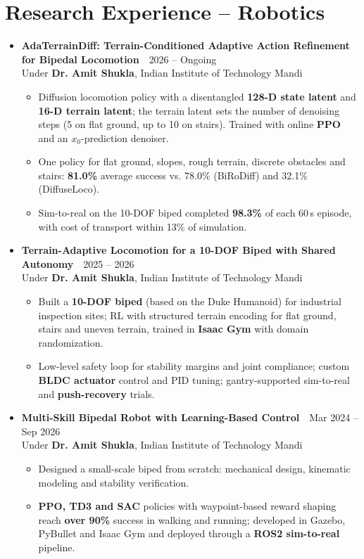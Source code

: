 \documentclass[letterpaper,10pt]{article}
\newcommand{\project}[3]{%
  \item[]\textbf{#1}\ \ {\small #2}\\
  {\small #3}\vspace{-4pt}}
\newenvironment{bullets}{\begin{itemize}[label=\textbullet]\small}{\end{itemize}\vspace{-2pt}}
\newenvironment{entries}{\begin{itemize}[leftmargin=0in, label={}, itemsep=6pt]}{\end{itemize}}
\begin{document}
\section{Research Experience -- Robotics}
\begin{entries}
  \project{AdaTerrainDiff: Terrain-Conditioned Adaptive Action Refinement for Bipedal Locomotion}{2026 -- Ongoing}
          {Under \textbf{Dr. Amit Shukla}, Indian Institute of Technology Mandi}
  \begin{bullets}
    \item Diffusion locomotion policy with a disentangled \textbf{128-D state latent} and \textbf{16-D terrain latent}; the terrain latent sets the number of denoising steps (5 on flat ground, up to 10 on stairs). Trained with online \textbf{PPO} and an $x_0$-prediction denoiser.
    \item One policy for flat ground, slopes, rough terrain, discrete obstacles and stairs: \textbf{81.0\%} average success vs. 78.0\% (BiRoDiff) and 32.1\% (DiffuseLoco).
    \item Sim-to-real on the 10-DOF biped completed \textbf{98.3\%} of each 60\,s episode, with cost of transport within 13\% of simulation.
  \end{bullets}

  \project{Terrain-Adaptive Locomotion for a 10-DOF Biped with Shared Autonomy}{2025 -- 2026}
          {Under \textbf{Dr. Amit Shukla}, Indian Institute of Technology Mandi}
  \begin{bullets}
    \item Built a \textbf{10-DOF biped} (based on the Duke Humanoid) for industrial inspection sites; RL with structured terrain encoding for flat ground, stairs and uneven terrain, trained in \textbf{Isaac Gym} with domain randomization.
    \item Low-level safety loop for stability margins and joint compliance; custom \textbf{BLDC actuator} control and PID tuning; gantry-supported sim-to-real and \textbf{push-recovery} trials.
  \end{bullets}

  \project{Multi-Skill Bipedal Robot with Learning-Based Control}{Mar 2024 -- Sep 2026}
          {Under \textbf{Dr. Amit Shukla}, Indian Institute of Technology Mandi}
  \begin{bullets}
    \item Designed a small-scale biped from scratch: mechanical design, kinematic modeling and stability verification.
    \item \textbf{PPO, TD3 and SAC} policies with waypoint-based reward shaping reach \textbf{over 90\%} success in walking and running; developed in Gazebo, PyBullet and Isaac Gym and deployed through a \textbf{ROS2 sim-to-real} pipeline.
  \end{bullets}


\end{entries}
\end{document}
